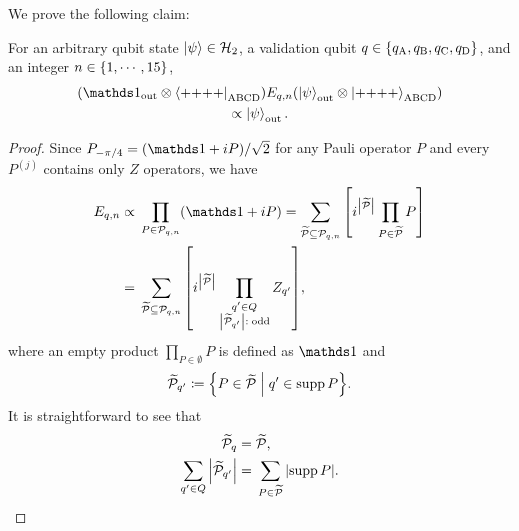 \documentclass[
 prx,
 reprint,
 superscriptaddress,
 longbibliography,
 dvipsnames
]{revtex4-2}
\begin{document}
We prove the following claim:
\begin{claim}
    For an arbitrary qubit state $\ket{\psi} \in \mathcal{H}_2$, a validation qubit $q \in \qty{q_{\mathrm{A}}, q_{\mathrm{B}}, q_{\mathrm{C}}, q_{\mathrm{D}}}$, and an integer $n \in \qty{1, \cdots, 15}$,
    \begin{multline}
        \qty(\identity_\mr{out} \otimes \bra{{+}{+}{+}{+}}_\mr{ABCD}) E_{q,n} \qty(\ket{\psi}_\mr{out} \otimes \ket{{+}{+}{+}{+}}_\mr{ABCD}) \\
        \propto \ket{\psi}_\mr{out}.  \label{eq:MSD_X_error_tolerance_proof}
    \end{multline} 
\end{claim}

\begin{proof}
    Since $\rot{P}{-\pi/4} = (\identity + iP)/\sqrt{2}$ for any Pauli operator $P$ and every $P^{(j)}$ contains only $Z$ operators, we have
    \begin{align}
        E_{q,n} \propto{}& \prod_{P \in \mathcal{P}_{q,n}} (\identity + iP) = \sum_{\widetilde{\mathcal{P}} \subseteq \mathcal{P}_{q,n}} \qty[ i^\abs{\widetilde{\mathcal{P}}} \prod_{P \in \widetilde{\mathcal{P}}} P ] \nonumber \\ 
        ={}& \sum_{\widetilde{\mathcal{P}} \subseteq \mathcal{P}_{q,n}} \qty[ i^\abs{\widetilde{\mathcal{P}}} \prod_{\substack{q' \in Q \\ \abs{\widetilde{\mathcal{P}}_{q'}}:\; \mr{odd}}} Z_{q'} ], \label{eq:E_qn}
    \end{align}
    where an empty product $\prod_{P \in \emptyset} P$ is defined as $\identity$ and
    \begin{align}
        \widetilde{\mathcal{P}}_{q'} \coloneqq \qty{P \in \widetilde{\mathcal{P}} \; \middle\vert \; q' \in \operatorname{supp}P}. \label{eq:abs_q_def}
    \end{align}
    It is straightforward to see that
    \begin{align*}
        \widetilde{\mathcal{P}}_{q} ={}& \widetilde{\mathcal{P}},\\ 
        \sum_{q' \in Q} \abs{\widetilde{\mathcal{P}}_{q'}} ={}& \sum_{P \in \widetilde{\mathcal{P}}} \abs{\operatorname{supp} P}.
    \end{align*}
    

\end{proof}
\end{document}

